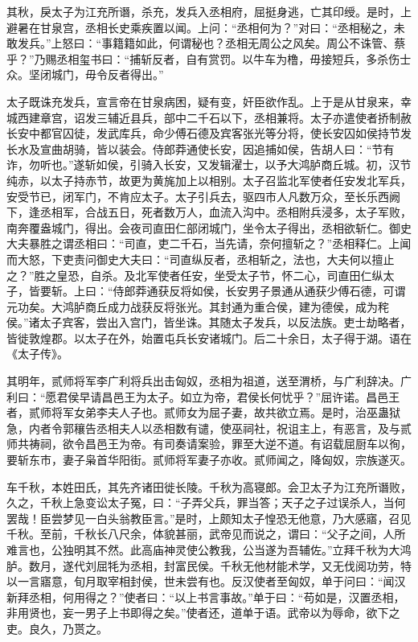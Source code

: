 \documentclass[12pt,UTF8]{ctexbook}
\begin{document}
其秋，戾太子为江充所谮，杀充，发兵入丞相府，屈挺身逃，亡其印绶。是时，上避暑在甘泉宫，丞相长史乘疾置以闻。上问：“丞相何为？”对曰：“丞相秘之，未敢发兵。”上怒曰：“事籍籍如此，何谓秘也？丞相无周公之风矣。周公不诛管、蔡乎？”乃赐丞相玺书曰：“捕斩反者，自有赏罚。以牛车为橹，毋接短兵，多杀伤士众。坚闭城门，毋令反者得出。”



太子既诛充发兵，宣言帝在甘泉病困，疑有变，奸臣欲作乱。上于是从甘泉来，幸城西建章宫，诏发三辅近县兵，部中二千石以下，丞相兼将。太子亦遣使者挢制赦长安中都官囚徒，发武库兵，命少傅石德及宾客张光等分将，使长安囚如侯持节发长水及宣曲胡骑，皆以装会。侍郎莽通使长安，因追捕如侯，告胡人曰：“节有诈，勿听也。”遂斩如侯，引骑入长安，又发辑濯士，以予大鸿胪商丘城。初，汉节纯赤，以太子持赤节，故更为黄旄加上以相别。太子召监北军使者任安发北军兵，安受节已，闭军门，不肯应太子。太子引兵去，驱四市人凡数万众，至长乐西阙下，逢丞相军，合战五日，死者数万人，血流入沟中。丞相附兵浸多，太子军败，南奔覆盎城门，得出。会夜司直田仁部闭城门，坐令太子得出，丞相欲斩仁。御史大夫暴胜之谓丞相曰：“司直，吏二千石，当先请，奈何擅斩之？”丞相释仁。上闻而大怒，下吏责问御史大夫曰：“司直纵反者，丞相斩之，法也，大夫何以擅止之？”胜之皇恐，自杀。及北军使者任安，坐受太子节，怀二心，司直田仁纵太子，皆要斩。上曰：“侍郎莽通获反将如侯，长安男子景通从通获少傅石德，可谓元功矣。大鸿胪商丘成力战获反将张光。其封通为重合侯，建为德侯，成为秺侯。”诸太子宾客，尝出入宫门，皆坐诛。其随太子发兵，以反法族。吏士劫略者，皆徙敦煌郡。以太子在外，始置屯兵长安诸城门。后二十余日，太子得于湖。语在《太子传》。



其明年，贰师将军李广利将兵出击匈奴，丞相为祖道，送至渭桥，与广利辞决。广利曰：“愿君侯早请昌邑王为太子。如立为帝，君侯长何忧乎？”屈许诺。昌邑王者，贰师将军女弟李夫人子也。贰师女为屈子妻，故共欲立焉。是时，治巫蛊狱急，内者令郭穰告丞相夫人以丞相数有谴，使巫祠社，祝诅主上，有恶言，及与贰师共祷祠，欲令昌邑王为帝。有司奏请案验，罪至大逆不道。有诏载屈厨车以徇，要斩东市，妻子枭首华阳街。贰师将军妻子亦收。贰师闻之，降匈奴，宗族遂灭。



车千秋，本姓田氏，其先齐诸田徙长陵。千秋为高寝郎。会卫太子为江充所谮败，久之，千秋上急变讼太子冤，曰：“子弄父兵，罪当答；天子之子过误杀人，当何罢哉！臣尝梦见一白头翁教臣言。”是时，上颇知太子惶恐无他意，乃大感寤，召见千秋。至前，千秋长八尺余，体貌甚丽，武帝见而说之，谓曰：“父子之间，人所难言也，公独明其不然。此高庙神灵使公教我，公当遂为吾辅佐。”立拜千秋为大鸿胪。数月，遂代刘屈牦为丞相，封富民侯。千秋无他材能术学，又无伐阅功劳，特以一言寤意，旬月取宰相封侯，世未尝有也。反汉使者至匈奴，单于问曰：“闻汉新拜丞相，何用得之？”使者曰：“以上书言事故。”单于曰：“苟如是，汉置丞相，非用贤也，妄一男子上书即得之矣。”使者还，道单于语。武帝以为辱命，欲下之吏。良久，乃贳之。
\end{document}
